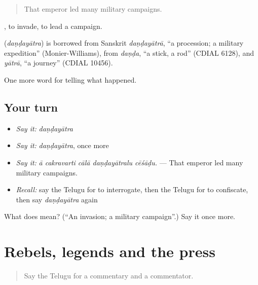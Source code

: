 \begin{quote}
That emperor led many military campaigns.
\end{quote}

 , to invade, to lead a campaign.

\begin{cousinweb}
\textbf{} (\emph{daṇḍayātra}) is borrowed from Sanskrit \emph{daṇḍayātrā}, \textquotedblleft{}a procession; a military expedition\textquotedblright{} (Monier-Williams), from \emph{daṇḍa}, \textquotedblleft{}a stick, a rod\textquotedblright{} (CDIAL 6128), and \emph{yātrā}, \textquotedblleft{}a journey\textquotedblright{} (CDIAL 10456).
\end{cousinweb}

\begin{grammarlens}[title={What you've built}]
One more word for telling what happened.
\end{grammarlens}

\subsection*{Your turn}
\begin{itemize}
\raggedright
  \item \emph{Say it:} \emph{daṇḍayātra}
  \item \emph{Say it:} \emph{daṇḍayātra}, once more
  \item \emph{Say it:} \emph{ā cakravarti cālā daṇḍayātralu cēśāḍu.} — That emperor led many military campaigns.
  \item \emph{Recall:} say the Telugu for to interrogate, then the Telugu for to confiscate, then say \emph{daṇḍayātra} again
\end{itemize}

\begin{tcolorbox}[breakable,colback=teal!4,colframe=teal!35!black,title={Before you move on}]
What does  mean? (\textquotedblleft{}An invasion; a military campaign\textquotedblright{}.) Say it once more.
\end{tcolorbox}
\section[(dialogue)]{Rebels, legends and the press}

\label{lesson:TE-R381-review-374-381}



\begin{quote}
Say the Telugu for a commentary and a commentator.
\end{quote}

